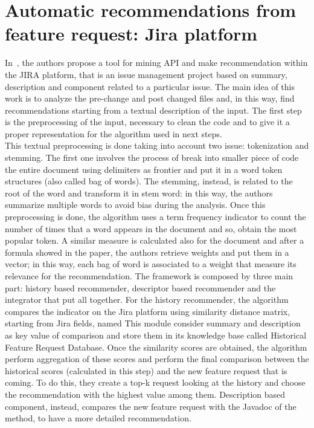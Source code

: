 \section{Automatic recommendations from feature request: Jira platform}
In~\cite{thung_automatic_2013}, the authors propose a tool for mining API and make recommendation within the JIRA platform, that is an issue management project based on summary, description and component related to a particular issue. The main idea of this work is to analyze the pre-change and post changed files and, in this way, find recommendations starting from a textual description of the input. The first step is the preprocessing of the input, necessary to clean the code and to give it a proper representation for the algorithm used in next steps. \\
This textual preprocessing is done taking into account two issue: tokenization and stemming. The first one involves the process of break into smaller piece of code the entire document using delimiters as frontier and put it in a word token structures (also called bag of words). The stemming, instead, is related to the root of the word and transform it in stem word: in this way, the authors summarize multiple words to avoid bias during the analysis. Once this preprocessing is done, the algorithm uses a term frequency indicator to count the number of times that a word appears in the document and so, obtain the most popular token. A similar measure is calculated also for the document and after a formula showed in the paper, the authors retrieve weights and put them in a vector; in this way, each bag of word is associated to a weight that measure its relevance for the recommendation. \newline
The framework is composed by three main part: history based recommender, descriptor based recommender and the integrator that put all together. For the history recommender, the algorithm compares the indicator on the Jira platform using similarity distance matrix, starting from Jira fields, named This module consider summary and description as key value of comparison and store them in its knowledge base called Historical Feature Request Database. Once the similarity scores are obtained, the algorithm perform aggregation of these scores and perform the final comparison between the historical scores (calculated in this step) and the new feature request that is coming. To do this, they create a top-k request looking at the history and choose the recommendation with the highest value among them. Description based component, instead, compares the new feature request with the Javadoc of the method, to have a more detailed recommendation. \\
